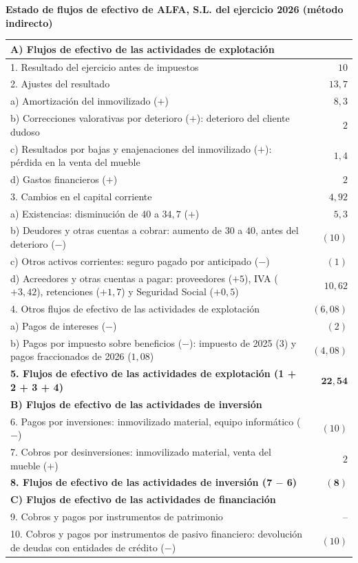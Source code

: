 \documentclass[10pt,a4paper]{article}
\begin{document}
\begin{center}\begin{minipage}{\linewidth}\centering
{\small\textbf{Estado de flujos de efectivo de ALFA, S.L. del ejercicio 2026 (método indirecto)}}\par\vspace{0.3em}
{\footnotesize
\begin{tabular}{p{11.2cm} r}
\hline
\textbf{A) Flujos de efectivo de las actividades de explotación} & \\
\hline
1. Resultado del ejercicio antes de impuestos & $10$ \tabularnewline
2. Ajustes del resultado & $13,7$ \tabularnewline
\quad a) Amortización del inmovilizado ($+$) & $8,3$ \tabularnewline
\quad b) Correcciones valorativas por deterioro ($+$): deterioro del cliente dudoso & $2$ \tabularnewline
\quad c) Resultados por bajas y enajenaciones del inmovilizado ($+$): pérdida en la venta del mueble & $1,4$ \tabularnewline
\quad d) Gastos financieros ($+$) & $2$ \tabularnewline
3. Cambios en el capital corriente & $4,92$ \tabularnewline
\quad a) Existencias: disminución de $40$ a $34,7$ ($+$) & $5,3$ \tabularnewline
\quad b) Deudores y otras cuentas a cobrar: aumento de $30$ a $40$, antes del deterioro ($-$) & $(10)$ \tabularnewline
\quad c) Otros activos corrientes: seguro pagado por anticipado ($-$) & $(1)$ \tabularnewline
\quad d) Acreedores y otras cuentas a pagar: proveedores ($+5$), IVA ($+3,42$), retenciones ($+1,7$) y Seguridad Social ($+0,5$) & $10,62$ \tabularnewline
4. Otros flujos de efectivo de las actividades de explotación & $(6,08)$ \tabularnewline
\quad a) Pagos de intereses ($-$) & $(2)$ \tabularnewline
\quad b) Pagos por impuesto sobre beneficios ($-$): impuesto de 2025 ($3$) y pagos fraccionados de 2026 ($1,08$) & $(4,08)$ \tabularnewline
\textbf{5. Flujos de efectivo de las actividades de explotación (1 + 2 + 3 + 4)} & $\mathbf{22,54}$ \tabularnewline
\hline
\textbf{B) Flujos de efectivo de las actividades de inversión} & \\
\hline
6. Pagos por inversiones: inmovilizado material, equipo informático ($-$) & $(10)$ \tabularnewline
7. Cobros por desinversiones: inmovilizado material, venta del mueble ($+$) & $2$ \tabularnewline
\textbf{8. Flujos de efectivo de las actividades de inversión (7 $-$ 6)} & $\mathbf{(8)}$ \tabularnewline
\hline
\textbf{C) Flujos de efectivo de las actividades de financiación} & \\
\hline
9. Cobros y pagos por instrumentos de patrimonio & -- \tabularnewline
10. Cobros y pagos por instrumentos de pasivo financiero: devolución de deudas con entidades de crédito ($-$) & $(10)$ \tabularnewline

\end{tabular}}
\end{minipage}
\end{center}
\end{document}
